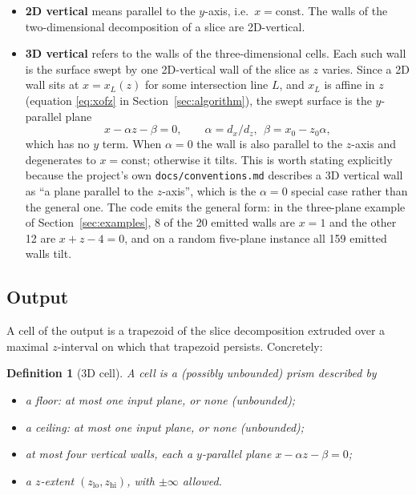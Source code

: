 \documentclass[11pt]{article}
\newtheorem{definition}{Definition}
\begin{document}
\begin{itemize}
\item \textbf{2D vertical} means parallel to the $y$-axis, i.e.\ $x =
  \mathrm{const}$.  The walls of the two-dimensional decomposition of a slice
  are 2D-vertical.
\item \textbf{3D vertical} refers to the walls of the three-dimensional cells.
  Each such wall is the surface swept by one 2D-vertical wall of the slice as
  $z$ varies.  Since a 2D wall sits at $x = x_L(z)$ for some intersection line
  $L$, and $x_L$ is affine in $z$ (equation \eqref{eq:xofz} in Section~\ref{sec:algorithm}), the swept surface is
  the $y$-parallel plane
  \[
    x - \alpha z - \beta = 0, \qquad \alpha = d_x/d_z,\ \ \beta = x_0 - z_0\alpha ,
  \]
  which has no $y$ term.  When $\alpha = 0$ the wall is also parallel to the
  $z$-axis and degenerates to $x = \mathrm{const}$; otherwise it tilts.  This is
  worth stating explicitly because the project's own
  \texttt{docs/conventions.md} describes a 3D vertical wall as ``a plane
  parallel to the $z$-axis'', which is the $\alpha = 0$ special case rather than
  the general one.  The code emits the general form: in the three-plane example
  of Section~\ref{sec:examples}, 8 of the 20 emitted walls are $x = 1$ and the
  other 12 are $x + z - 4 = 0$, and on a random five-plane instance all 159
  emitted walls tilt.
\end{itemize}

\subsection{Output}

A cell of the output is a trapezoid of the slice decomposition extruded over a
maximal $z$-interval on which that trapezoid persists.  Concretely:

\begin{definition}[3D cell]
A cell is a (possibly unbounded) prism described by
\begin{itemize}
\item a \emph{floor}: at most one input plane, or none (unbounded);
\item a \emph{ceiling}: at most one input plane, or none (unbounded);
\item at most four \emph{vertical walls}, each a $y$-parallel plane
  $x - \alpha z - \beta = 0$;
\item a $z$-extent $(z_{\mathrm{lo}}, z_{\mathrm{hi}})$, with $\pm\infty$
  allowed.
\end{itemize}
\end{definition}
\end{document}
